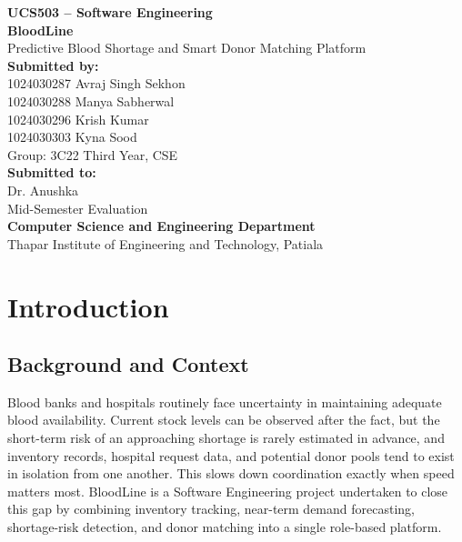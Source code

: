 \documentclass[12pt,twoside]{report}
\title{}
\date{}
\begin{document}
\begin{titlepage}
\centering
\vspace*{2cm}
{\large \textbf{UCS503 -- Software Engineering}}\\[3cm]

{\Huge \textbf{BloodLine}}\\[0.5cm]
{\large Predictive Blood Shortage and Smart Donor Matching Platform}\\[3cm]

{\large \textbf{Submitted by:}}\\[0.4cm]
1024030287 Avraj Singh Sekhon\\
1024030288 Manya Sabherwal\\
1024030296 Krish Kumar\\
1024030303 Kyna Sood\\[0.4cm]
Group: 3C22 Third Year, CSE\\[2cm]

{\large \textbf{Submitted to:}}\\[0.4cm]
Dr. Anushka\\[3cm]

Mid-Semester Evaluation\\
\textbf{Computer Science and Engineering Department}\\
Thapar Institute of Engineering and Technology, Patiala

\end{titlepage}

\tableofcontents
\clearpage
{}
\setcounter{page}{1}

\chapter{Introduction}

\section{Background and Context}

Blood banks and hospitals routinely face uncertainty in maintaining adequate blood availability. Current stock levels can be observed after the fact, but the short-term risk of an approaching shortage is rarely estimated in advance, and inventory records, hospital request data, and potential donor pools tend to exist in isolation from one another. This slows down coordination exactly when speed matters most. BloodLine is a Software Engineering project undertaken to close this gap by combining inventory tracking, near-term demand forecasting, shortage-risk detection, and donor matching into a single role-based platform.
\end{document}
